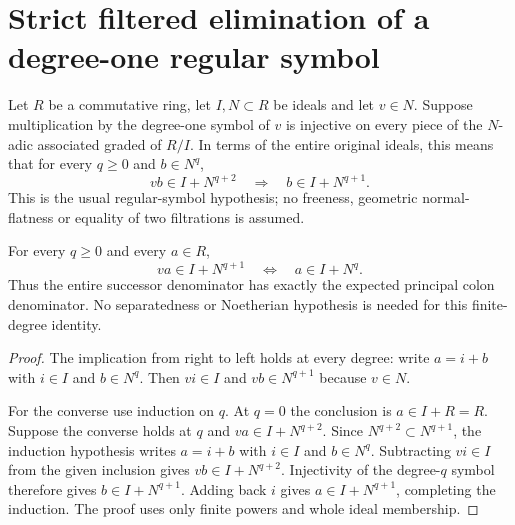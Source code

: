 \section{Strict filtered elimination of a degree-one regular symbol}

Let $R$ be a commutative ring, let $I,N\subset R$ be ideals and let
$v\in N$. Suppose multiplication by the degree-one symbol of $v$ is
injective on every piece of the $N$-adic associated graded of $R/I$.
In terms of the entire original ideals, this means that for every
$q\geq0$ and $b\in N^q$,
\[
 vb\in I+N^{q+2}\quad\Longrightarrow\quad b\in I+N^{q+1}.
\]
This is the usual regular-symbol hypothesis; no freeness, geometric
normal-flatness or equality of two filtrations is assumed.

\begin{theorem}
\label{hir:regular-symbol-whole-successor-division}
\leanok
For every $q\geq0$ and every $a\in R$,
\[
 va\in I+N^{q+1}\quad\Longleftrightarrow\quad a\in I+N^q.
\]
Thus the entire successor denominator has exactly the expected
principal colon denominator. No separatedness or Noetherian
hypothesis is needed for this finite-degree identity.
\end{theorem}
\begin{proof}
The implication from right to left holds at every degree: write
$a=i+b$ with $i\in I$ and $b\in N^q$. Then $vi\in I$ and
$vb\in N^{q+1}$ because $v\in N$.

For the converse use induction on $q$. At $q=0$ the conclusion is
$a\in I+R=R$. Suppose the converse holds at $q$ and
$va\in I+N^{q+2}$. Since $N^{q+2}\subset N^{q+1}$, the induction
hypothesis writes $a=i+b$ with $i\in I$ and $b\in N^q$.
Subtracting $vi\in I$ from the given inclusion gives
$vb\in I+N^{q+2}$. Injectivity of the degree-$q$ symbol therefore
gives $b\in I+N^{q+1}$. Adding back $i$ gives
$a\in I+N^{q+1}$, completing the induction. The proof uses only
finite powers and whole ideal membership.
\end{proof}


